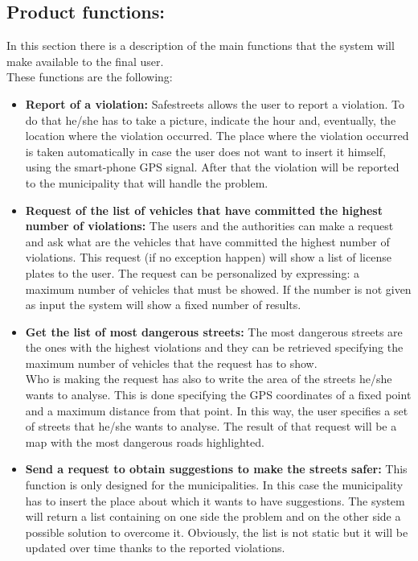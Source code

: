 \documentclass[titlepage]{article}
\begin{document}
\subsection{Product functions: }
In this section there is a description of the main functions that the system will make available to the final user.\\
These functions are the following:
\begin{itemize}
	\item \textbf{Report of a violation:} Safestreets allows the user to report a violation. To do that he/she has to take a picture, indicate the hour and, eventually, the location where the violation occurred. The place where the violation occurred is taken automatically in case the user does not want to insert it himself, using the smart-phone GPS signal. After that the violation will be reported to the municipality that will handle the problem.
	\item \textbf{Request of the list of vehicles that have committed the highest number of violations:}
	The users and the authorities can make a request and ask what are the vehicles that have committed the highest number of violations. This request (if no exception happen) will show a list of license plates to the user. The request can be personalized by expressing: a maximum number of vehicles that must be showed. If the number is not given as input the system will show a fixed number of results.
	\item \textbf{Get the list of most dangerous streets: }
	The most dangerous streets are the ones with the highest violations and they can be retrieved specifying the maximum number of vehicles that the request has to show. \\
Who is making the request has also to write the area of the streets he/she wants to analyse. This is done specifying the GPS coordinates of a fixed point and a maximum distance from that point. In this way, the user specifies a set of streets that he/she wants to analyse. The result of that request will be a map with the most dangerous roads highlighted.
	\item \textbf{Send a request to obtain suggestions to make the streets safer:}
	This function is only designed for the municipalities. In this case the municipality has to insert the place about which it wants to have suggestions. The system will return a list containing on one side the problem and on the other side a possible solution to overcome it. Obviously, the list is not static but it will be updated over time thanks to the reported violations.

\end{itemize}
\end{document}
